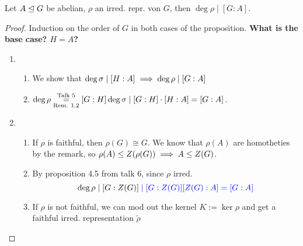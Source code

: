 \documentclass[a4paper]{article}
\begin{document}
\begin{cor}
  Let $A \trianglelefteq G$ be abelian, $\rho$ an irred. repr. von $G$, then $\deg \rho \mid [G:A]$.
  \begin{proof}
    Induction on the order of $G$ in both cases of the proposition.
    \textbf{What is the base case? $H=A$?}
    \begin{enumerate}[{Case }(a):]
            \item \begin{enumerate}[(1)]
                    \item We show that $\deg \sigma \mid [H:A] \implies \deg \rho \mid [G:A]$
                    \item $\deg \rho \overunderset{\text{Talk 5}}{\text{Rem. 1.2}} = [G:H] \deg \s \mid [G:H]\cd[H:A] = [G:A]$.
                  \end{enumerate}
      \item \begin{enumerate}[(1)]
              \item If $\rho$ is faithful, then $\rho(G) \cong G$. We know that $\rho(A)$ are homotheties by the remark, so $\rho(A) \le Z(\rho(G)) \implies A \le Z(G)$.
              \item By proposition 4.5 from talk 6, since $\rho$ irred.
                    \[\deg \rho \mid [G:Z(G)] \color{blue} \mid [G:Z(G)][Z(G):A] = [G:A]\]
              \item If $\rho$ is not faithful, we can mod out the kernel $K := \ker \rho$ and get a faithful irred. representation $\tilde \rho$

\end{enumerate}
\end{enumerate}
\end{proof}
\end{cor}
\end{document}
